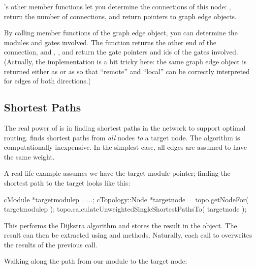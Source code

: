 's other member functions let you determine the
connections of this node: ,  return
the number of connections,  and
 return pointers to graph edge objects.


By calling member functions of the graph edge object, you can
determine the modules and gates involved. The 
function returns the other end of the connection, and
, ,  and
 return the gate pointers and ids of the gates
involved. (Actually, the implementation is a bit tricky here: the same
graph edge object  is returned either as
 or as  so that ``remote''
and ``local'' can be correctly interpreted for edges of both
directions.)





\subsection{Shortest Paths}

The real power of  is in finding shortest
paths in the network to support optimal
routing.  finds shortest paths
from \textit{all} nodes \textit{to} a target node. The algorithm is
computationally inexpensive. In the simplest case, all edges are
assumed to have the same weight.

A real-life example assumes we have the target module pointer; finding
the shortest path to the target looks like this:

\begin{cpp}
cModule *targetmodulep =...;
cTopology::Node *targetnode = topo.getNodeFor( targetmodulep );
topo.calculateUnweightedSingleShortestPathsTo( targetnode );
\end{cpp}


This performs the Dijkstra algorithm and
stores the result in the  object. The result can
then be extracted using  and
 methods.  Naturally, each call to
 overwrites the results of
the previous call.

Walking along the path from our module to the target node:

